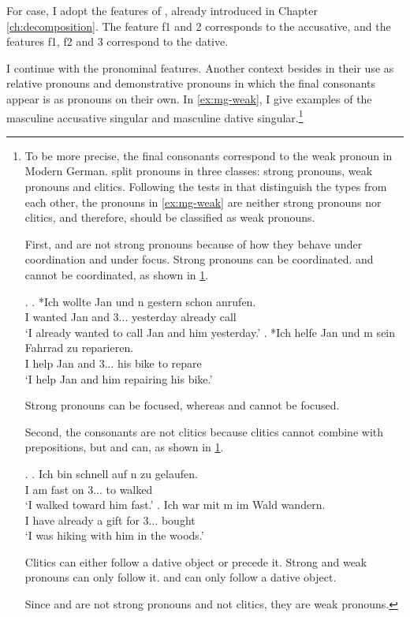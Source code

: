 For case, I adopt the features of \citet{caha2009}, already introduced in Chapter \ref{ch:decomposition}. The feature \ac{f}1 and 2 corresponds to the accusative, and the features \ac{f}1, \ac{f}2 and 3 correspond to the dative.

I continue with the pronominal features. Another context besides in their use as relative pronouns and demonstrative pronouns in which the final consonants appear is as pronouns on their own. In \ref{ex:mg-weak}, I give examples of the masculine accusative singular and masculine dative singular.\footnote{
To be more precise, the final consonants correspond to the weak pronoun in Modern German. \citet{cardinaletti1994} split pronouns in three classes: strong pronouns, weak pronouns and clitics. Following the tests in \citet{cardinaletti1994} that distinguish the types from each other, the pronouns in \ref{ex:mg-weak} are neither strong pronouns nor clitics, and therefore, should be classified as weak pronouns.

First,  and  are not strong pronouns because of how they behave under coordination and under focus.
Strong pronouns can be coordinated.  and  cannot be coordinated, as shown in \ref{ex:wk-pron-coord}.

\ex.\label{ex:wk-pron-coord}
\ag. *Ich wollte Jan und n gestern schon anrufen.\\
 I wanted Jan and 3... yesterday already call\\
 `I already wanted to call Jan and him yesterday.'
\bg. *Ich helfe Jan und m sein Fahrrad zu reparieren.\\
 I help Jan and 3... his bike to repare\\
 `I help Jan and him repairing his bike.'

Strong pronouns can be focused, whereas  and  cannot be focused.

Second, the consonants are not clitics because clitics cannot combine with prepositions, but  and  can, as shown in \ref{ex:wk-pron-prep}.

\ex.\label{ex:wk-pron-prep}
\ag. Ich bin schnell auf n zu gelaufen.\\
 I am fast on 3... to walked\\
 `I walked toward him fast.'
\bg. Ich war mit m im Wald wandern.\\
 I have already a gift for 3... bought\\
 `I was hiking with him in the woods.'

Clitics can either follow a dative object or precede it. Strong and weak pronouns can only follow it.  and  can only follow a dative object.

Since  and  are not strong pronouns and not clitics, they are weak pronouns.}

